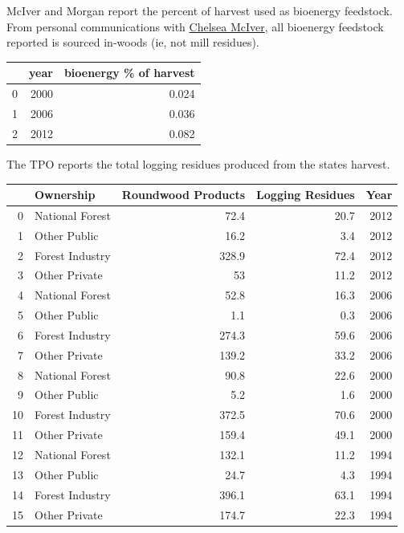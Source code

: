 \documentclass[a4paper]{article}
\begin{document}
McIver and Morgan report the percent of harvest used as bioenergy
feedstock. From personal communications with
\href{http://www.bber.umt.edu/staff/mciver.asp}{Chelsea McIver}, all
bioenergy feedstock reported is sourced in-woods (ie, not mill
residues).

\begin{center}
\begin{tabular}{rrr}
 & year & bioenergy \% of harvest\\
\hline
0 & 2000 & 0.024\\
1 & 2006 & 0.036\\
2 & 2012 & 0.082\\
\end{tabular}

\end{center}

The TPO reports the total logging residues produced from the states
harvest.

\begin{center}
\begin{tabular}{rlrrr}
 & Ownership & Roundwood Products & Logging Residues & Year\\
\hline
0 & National Forest & 72.4 & 20.7 & 2012\\
1 & Other Public & 16.2 & 3.4 & 2012\\
2 & Forest Industry & 328.9 & 72.4 & 2012\\
3 & Other Private & 53 & 11.2 & 2012\\
4 & National Forest & 52.8 & 16.3 & 2006\\
5 & Other Public & 1.1 & 0.3 & 2006\\
6 & Forest Industry & 274.3 & 59.6 & 2006\\
7 & Other Private & 139.2 & 33.2 & 2006\\
8 & National Forest & 90.8 & 22.6 & 2000\\
9 & Other Public & 5.2 & 1.6 & 2000\\
10 & Forest Industry & 372.5 & 70.6 & 2000\\
11 & Other Private & 159.4 & 49.1 & 2000\\
12 & National Forest & 132.1 & 11.2 & 1994\\
13 & Other Public & 24.7 & 4.3 & 1994\\
14 & Forest Industry & 396.1 & 63.1 & 1994\\
15 & Other Private & 174.7 & 22.3 & 1994\\
\end{tabular}

\end{center}
\end{document}
